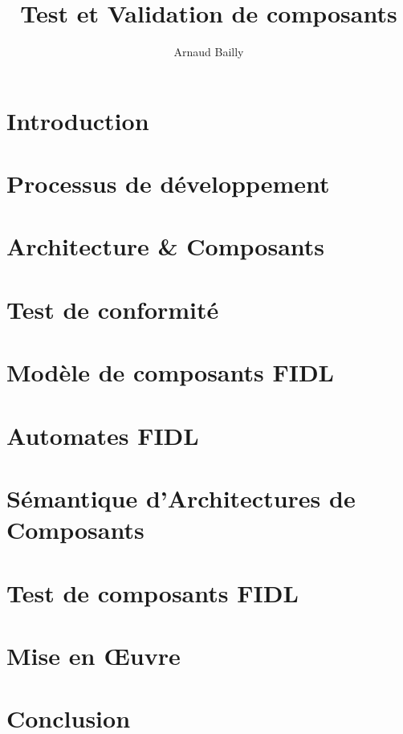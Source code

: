 \documentclass[a4paper,10pt,leqno,twoside]{book}
\title{Test et Validation de composants}
\author{Arnaud Bailly}
\begin{document}
\sloppy
\tableofcontents
\chapter*{Introduction}
%
\chapter{Processus de d\'eveloppement}
\label{cha:proc-de-devol}

\chapter{Architecture \& Composants}
\label{chap-etatart}

\chapter{Test de conformit\'e}
\label{chap-etatarttest}

\chapter{Mod\`ele de composants FIDL}
\label{chap-fidl}

\chapter{Automates \textsf{FIDL}}
\label{cha:automates-fidl}

\chapter{S\'emantique d'Architectures de Composants}
\label{cha:composition}

\chapter{Test de composants FIDL}
\label{cha:test}

\chapter{Mise en \OE uvre}
\label{cha:methodes--outils}

\chapter*{Conclusion}
%

\end{document}
